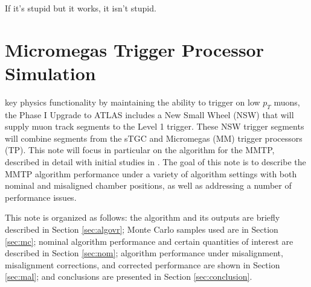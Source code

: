 \begin{savequote}[75mm]
If it's stupid but it works, it isn't stupid.
\end{savequote}

\chapter{Micromegas Trigger Processor Simulation}

 key physics functionality by maintaining the ability to trigger on low $p_T$ muons, the Phase I Upgrade to ATLAS includes a New Small Wheel (NSW) that will supply muon track segments to the Level 1 trigger.  These NSW trigger segments will combine segments from the sTGC and Micromegas (MM) trigger processors (TP).  This note will focus in particular on the algorithm for the MMTP, described in detail with initial studies in \cite{blcnote}.  The goal of this note is to describe the MMTP algorithm performance under a variety of algorithm settings with both nominal and misaligned chamber positions, as well as addressing a number of performance issues.

This note is organized as follows: the algorithm and its outputs are briefly described in Section \ref{sec:algovr}; Monte Carlo samples used are in Section \ref{sec:mc}; nominal algorithm performance and certain quantities of interest are described in Section \ref{sec:nom}; algorithm performance under misalignment, misalignment corrections, and corrected performance are shown in Section \ref{sec:mal}; and conclusions are presented in Section \ref{sec:conclusion}.

